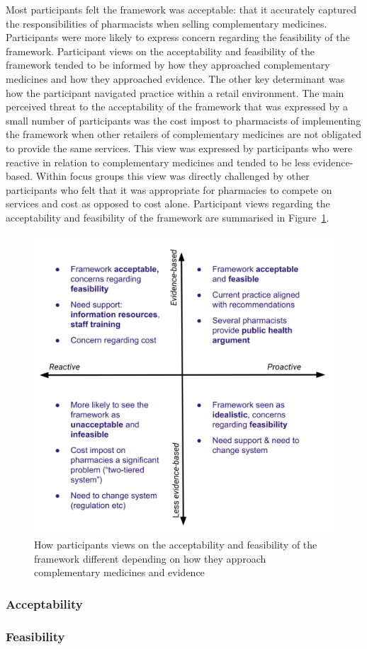 \documentclass[11pt,a4paper]{article}
\begin{document}
Most participants felt the framework was acceptable: that it accurately
captured the responsibilities of pharmacists when selling complementary
medicines. Participants were more likely to express concern regarding
the feasibility of the framework. Participant views on the acceptability
and feasibility of the framework tended to be informed by how they
approached complementary medicines and how they approached evidence. The
other key determinant was how the participant navigated practice within
a retail environment. The main perceived threat to the acceptability of
the framework that was expressed by a small number of participants was
the cost impost to pharmacists of implementing the framework when other
retailers of complementary medicines are not obligated to provide the
same services. This view was expressed by participants who were reactive
in relation to complementary medicines and tended to be less
evidence-based. Within focus groups this view was directly challenged by
other participants who felt that it was appropriate for pharmacies to
compete on services and cost as opposed to cost alone. Participant views
regarding the acceptability and feasibility of the framework are
summarised in Figure~\ref{accfeas}.

\begin{figure}
\centering
\includegraphics{files/CMEthics_accfeas.png}
\caption{How participants views on the acceptability and feasibility of
the framework different depending on how they approach complementary
medicines and evidence \label{accfeas}}
\end{figure}

\subsubsection{Acceptability}\label{acceptability}

\subsubsection{Feasibility}\label{feasibility}

\printbibliography[title=References]
\end{document}
